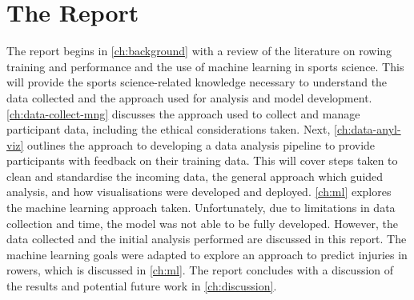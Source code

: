 \section{The Report}
The report begins in \autoref{ch:background} with a review of the literature on rowing training and performance and the use of machine learning in sports science. This will provide the sports science-related knowledge necessary to understand the data collected and the approach used for analysis and model development. \autoref{ch:data-collect-mng} discusses the approach used to collect and manage participant data, including the ethical considerations taken. Next, \autoref{ch:data-anyl-viz} outlines the approach to developing a data analysis pipeline to provide participants with feedback on their training data. This will cover steps taken to clean and standardise the incoming data, the general approach which guided analysis, and how visualisations were developed and deployed. \autoref{ch:ml} explores the machine learning approach taken. Unfortunately, due to limitations in data collection and time, the model was not able to be fully developed. However, the data collected and the initial analysis performed are discussed in this report. The machine learning goals were adapted to explore an approach to predict injuries in rowers, which is discussed in \autoref{ch:ml}. The report concludes with a discussion of the results and potential future work in \autoref{ch:discussion}.
